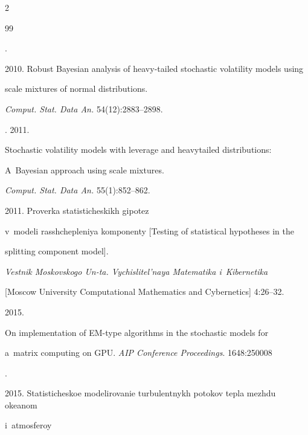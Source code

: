 \begin{multicols}{2}
{{\begin{thebibliography}{99}

. 

2010. Robust Bayesian analysis of heavy-tailed stochastic volatility models using 

scale mixtures of normal distributions. 

\textit{Comput. Stat. Data An.} 54(12):2883--2898.




. 2011. 

Stochastic volatility models with leverage and heavytailed distributions: 

A~Bayesian approach using scale mixtures.

\textit{Comput. Stat.  Data An.} 55(1):852--862.




 2011. Proverka statisticheskikh gipotez 

v~modeli rasshchepleniya komponenty [Testing of statistical hypotheses in the 

splitting component model]. 

\textit{Vestnik Moskovskogo Un-ta. Vychislitel'naya Matematika i~Kibernetika}

[Moscow University Computational Mathematics and Cybernetics] 4:26--32.




 2015. 

On implementation of EM-type algorithms in the stochastic models for 

a~matrix computing on GPU. \textit{AIP Conference Proceedings}. 1648:250008






. 

2015. Statisticheskoe modelirovanie turbulentnykh potokov tepla mezhdu okeanom 

i~at\-mo\-sfe\-roy\linebreak\vspace*{-12pt}



\pagebreak




\end{thebibliography}}}
\end{multicols}
